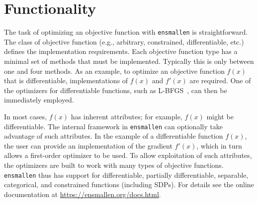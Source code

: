 \documentclass[twoside,11pt]{article}
\begin{document}
\begin{table}[!t]
{{%
%
}
\label{tab:comparison}
\vspace{-1.5ex}
}
\end{table}

\section{Functionality}
\label{sec:overview}

The task of optimizing an objective function with {\tt ensmallen} is
straightforward.  The class of objective function (e.g., arbitrary, constrained,
differentiable, etc.) defines the implementation requirements.
Each objective function type has a minimal set of methods that must be implemented.
Typically this is only between one and four methods.
As an example,
to optimize an objective function $f(x)$ that is differentiable,
implementations of $f(x)$ and $f'(x)$ are required.
One of the optimizers for differentiable functions,
such as L-BFGS~\citep{liu1989limited},
can then be immediately employed.


In most cases, $f(x)$ has inherent attributes;
for example, $f(x)$ might be differentiable.
The internal framework in {\tt ensmallen} can optionally take advantage of such attributes.
In the example of a differentiable function $f(x)$,
the user can provide an implementation of the gradient $f'(x)$,
which in turn allows a first-order optimizer to be used.
To allow exploitation of such attributes, the optimizers are built to work with
many types of objective functions.  {\tt ensmallen} thus has support for
differentiable, partially differentiable, separable, categorical, and
constrained functions (including SDPs).  For details
see the online documentation at \mbox{\url{https://ensmallen.org/docs.html}}.
\end{document}
